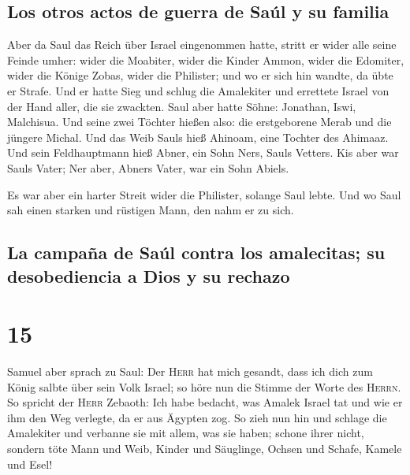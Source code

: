 \hypertarget{los-otros-actos-de-guerra-de-sauxfal-y-su-familia}{%
\subsection{Los otros actos de guerra de Saúl y su
familia}\label{los-otros-actos-de-guerra-de-sauxfal-y-su-familia}}

 Aber da Saul das Reich über Israel eingenommen hatte,
stritt er wider alle seine Feinde umher: wider die Moabiter, wider die
Kinder Ammon, wider die Edomiter, wider die Könige Zobas, wider die
Philister; und wo er sich hin wandte, da übte er Strafe. 
Und er hatte Sieg und schlug die Amalekiter und errettete Israel von der
Hand aller, die sie zwackten.  Saul aber hatte Söhne:
Jonathan, Iswi, Malchisua. Und seine zwei Töchter hießen also: die
erstgeborene Merab und die jüngere Michal.  Und das Weib
Sauls hieß Ahinoam, eine Tochter des Ahimaaz. Und sein Feldhauptmann
hieß Abner, ein Sohn Ners, Sauls Vetters.  Kis aber war
Sauls Vater; Ner aber, Abners Vater, war ein Sohn Abiels.

 Es war aber ein harter Streit wider die Philister,
solange Saul lebte. Und wo Saul sah einen starken und rüstigen Mann, den
nahm er zu sich.

\hypertarget{la-campauxf1a-de-sauxfal-contra-los-amalecitas-su-desobediencia-a-dios-y-su-rechazo}{%
\subsection{La campaña de Saúl contra los amalecitas; su desobediencia a
Dios y su
rechazo}\label{la-campauxf1a-de-sauxfal-contra-los-amalecitas-su-desobediencia-a-dios-y-su-rechazo}}

\hypertarget{section-14}{%
\section{15}\label{section-14}}

 Samuel aber sprach zu Saul: Der \textsc{Herr} hat mich
gesandt, dass ich dich zum König salbte über sein Volk Israel; so höre
nun die Stimme der Worte des \textsc{Herrn}.  So spricht
der \textsc{Herr} Zebaoth: Ich habe bedacht, was Amalek Israel tat und
wie er ihm den Weg verlegte, da er aus Ägypten zog.  So
zieh nun hin und schlage die Amalekiter und verbanne sie mit allem, was
sie haben; schone ihrer nicht, sondern töte Mann und Weib, Kinder und
Säuglinge, Ochsen und Schafe, Kamele und Esel!

